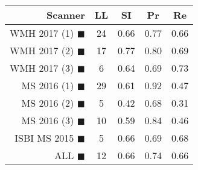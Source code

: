 \begin{tabular}{rcccc}
\toprule
Scanner & LL & SI & Pr & Re \\
\midrule
WMH 2017 (1) {\color[rgb]{ 1.00 0.00 0.00}$\blacksquare$} & 24 & 0.66 & 0.77 & 0.66 \\
WMH 2017 (2) {\color[rgb]{ 1.00 0.50 0.00}$\blacksquare$} & 17 & 0.77 & 0.80 & 0.69 \\
WMH 2017 (3) {\color[rgb]{ 1.00 0.80 0.00}$\blacksquare$} & 6 & 0.64 & 0.69 & 0.73 \\
MS  2016 (1) {\color[rgb]{ 0.20 0.80 0.00}$\blacksquare$} & 29 & 0.61 & 0.92 & 0.47 \\
MS  2016 (2) {\color[rgb]{ 0.00 0.40 1.00}$\blacksquare$} & 5 & 0.42 & 0.68 & 0.31 \\
MS  2016 (3) {\color[rgb]{ 0.60 0.00 1.00}$\blacksquare$} & 10 & 0.59 & 0.84 & 0.46 \\
ISBI MS 2015 {\color[rgb]{ 1.00 0.00 1.00}$\blacksquare$} & 5 & 0.66 & 0.69 & 0.68 \\
\midrule
ALL {\color[rgb]{ 1.00 1.00 1.00}$\blacksquare$} & 12 & 0.66 & 0.74 & 0.66 \\
\bottomrule
\end{tabular}